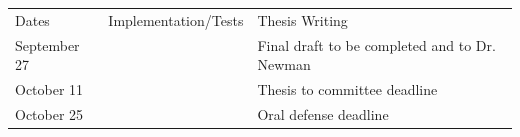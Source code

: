 \begin{longtable}{lXX}
	Dates & Implementation/Tests & Thesis Writing \\
	September 27 & & Final draft to be completed and to Dr. Newman \\
	October 11 & & Thesis to committee deadline \\
	October 25 & & Oral defense deadline \\
\end{longtable}